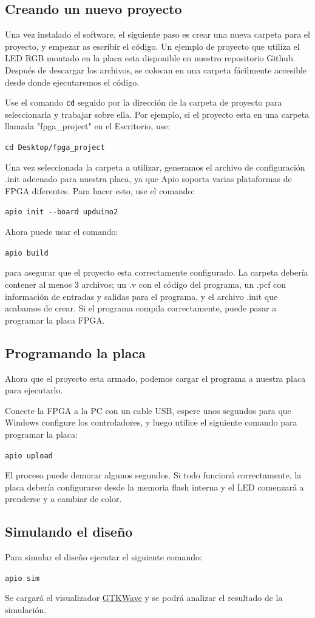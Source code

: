 \documentclass[11pt, a4paper, oneside]{article}
\begin{document}
\subsection{Creando un nuevo proyecto}
Una vez instalado el software, el siguiente paso es crear una nueva carpeta para el proyecto, y empezar as escribir el código. Un ejemplo de proyecto que utiliza el LED RGB montado en la placa esta disponible en nuestro repositorio Github. Después de descargar los archivos, se colocan en una carpeta fácilmente accesible desde donde ejecutaremos el código.

Use el comando \texttt{cd} seguido por la dirección de la carpeta de proyecto para seleccionarla y trabajar sobre ella. Por ejemplo, si el proyecto esta en una carpeta llamada "fpga\_project" en el Escritorio, use:
\begin{center}
	\texttt{cd Desktop/fpga\_project}
\end{center}

Una vez seleccionada la carpeta a utilizar, generamos el archivo de configuración .init adecuado para nuestra placa, ya que Apio soporta varias plataformas de FPGA diferentes. Para hacer esto, use el comando:
\begin{center}
	\texttt{apio init -{}-board upduino2}
\end{center}

Ahora puede usar el comando:
\begin{center}
	\texttt{apio build}
\end{center}
 para asegurar que el proyecto esta correctamente configurado. La carpeta debería contener al menos 3 archivos; un .v con el código del programa, un .pcf con información de entradas y salidas para el programa, y el archivo .init que acabamos de crear. Si el programa compila correctamente, puede pasar a programar la placa FPGA.
 
\subsection{Programando la placa}
Ahora que el proyecto esta armado, podemos cargar el programa a nuestra placa para ejecutarlo.

Conecte la FPGA a la PC con un cable USB, espere unos segundos para que Windows configure los controladores, y luego utilice el siguiente comando para programar la placa:
\begin{center}
	\texttt{apio upload}
\end{center}

El proceso puede demorar algunos segundos. Si todo funcionó correctamente, la placa debería configurarse desde la memoria flash interna y el LED comenzará a prenderse y a cambiar de color.

\subsection{Simulando el diseño}
Para simular el diseño ejecutar el siguiente comando:
\begin{center}
	\texttt{apio sim}
\end{center}

Se cargará el visualizador \href{http://gtkwave.sourceforge.net}{GTKWave} y se podrá analizar el resultado de la simulación.


\end{document}
